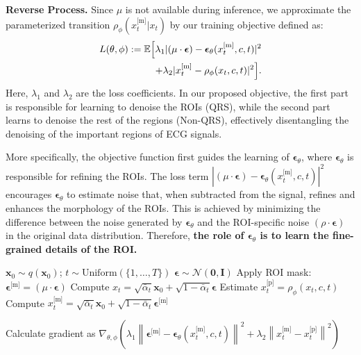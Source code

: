 \documentclass[letterpaper]{article} %
\newcommand{\grad}{\nabla}
\newcommand{\bI}{\mathbf{I}}
\newcommand{\bzero}{\mathbf{0}}
\newcommand{\bx}{\mathbf{x}}
\newcommand{\bepsilon}{{\boldsymbol{\epsilon}}}
\newcommand{\x}{{\boldsymbol x}}
\begin{document}
\noindent\textbf{Reverse Process.} Since $\mu$ is not available during inference, we approximate the parameterized transition $\rho_{\phi}(x_t^{\text{[m]}} | x_t)$ by our training objective defined as:
\begin{equation}
\begin{aligned}
\label{eq:rddm-objective}
 L(\theta, \phi):=\mathbb{E}\Big{[} \lambda_{1} | (\mu \cdot \boldsymbol{\epsilon})-\boldsymbol{\epsilon}_\theta(x_t^{\text{[m]}}, c,  t)|^2 \\ + \lambda_{2} |x_t^{\text{[m]}} - \rho_{\phi}(x_t, c, t)|^2\Big{]}.
\end{aligned}
\end{equation}
Here, $\lambda_{1}$ and $\lambda_{2}$ are the loss coefficients. In our proposed objective, the first part is responsible for learning to denoise the ROIs (QRS), while the second part learns to denoise the rest of the regions (Non-QRS), effectively disentangling the denoising of the important regions of ECG signals.

More specifically, the objective function first guides the learning of $\boldsymbol{\epsilon}_\theta$, where $\boldsymbol{\epsilon}_\theta$ is responsible for refining the ROIs. The loss term $|(\mu \cdot \boldsymbol{\epsilon})-\boldsymbol{\epsilon}_\theta(x_t^{\text{[m]}}, c, t)|^2$ encourages $\boldsymbol{\epsilon}_\theta$ to estimate noise that, when subtracted from the signal, refines and enhances the morphology of the ROIs. This is achieved by minimizing the difference between the noise generated by $\boldsymbol{\epsilon}_\theta$ and the ROI-specific noise $(\rho \cdot \boldsymbol{\epsilon})$ in the original data distribution. Therefore, \textbf{the role of $\boldsymbol{\epsilon}_\theta$ is to learn the fine-grained details of the ROI.}

\algrenewcommand\algorithmicindent{0.5em}
\begin{algorithm}[t]
  \caption{RDDM Training} \label{alg:training}
  \small
  \begin{algorithmic}[1]
    \Repeat
      \State $\bx_0 \sim q(\bx_0)$; 
      \State $t \sim \mathrm{Uniform}(\{1, \dotsc, T\})$
      \State $\bepsilon\sim\mathcal{N}(\bzero,\bI)$
      \State Apply ROI mask: $\bepsilon^{\text{[m]}} = (\mu \cdot \bepsilon)$
      \State Compute $x_t = \sqrt{\bar\alpha_t} \x_0 + \sqrt{1-\bar\alpha_t}\bepsilon$
      \State Estimate $x_t^{\text{[p]}} = \rho_{\phi}(x_t, c, t)$
      \State Compute $x_t^{\text{[m]}} = \sqrt{\bar\alpha_t} \x_0 + \sqrt{1-\bar\alpha_t}\bepsilon^{\text{[m]}}$
      
      \State Calculate gradient as
      \Statex $\grad_{\theta, \phi}\!\left( \lambda_{1} \left\| \bepsilon^{\text{[m]}}\!-\!\bepsilon_\theta(x_t^{\text{[m]}}, c, t) \right\|^2\! +\! \lambda_{2}  \left\| x_t^{\text{[m]}}\! -\! x_t^{\text{[p]}} \right\|^2 \right)$
  \end{algorithmic}
\end{algorithm}
\end{document}
